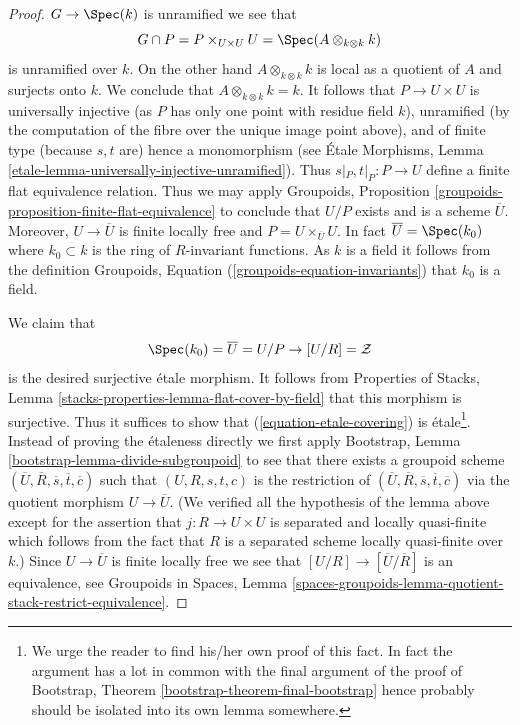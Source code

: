 \begin{proof}
$G \to \Spec(k)$ is unramified we see that
$$
G \cap P = P \times_{U \times U} U = \Spec(A \otimes_{k \otimes k} k)
$$
is unramified over $k$. On the other hand $A \otimes_{k \otimes k} k$
is local as a quotient of $A$ and surjects onto $k$. We conclude that
$A \otimes_{k \otimes k} k = k$. It follows that $P \to U \times U$
is universally injective (as $P$ has only one point with residue field $k$),
unramified (by the computation of the fibre over the unique image point
above), and of finite type (because $s, t$ are) hence a monomorphism (see
\'Etale Morphisms, Lemma
\ref{etale-lemma-universally-injective-unramified}).
Thus $s|_P, t|_P : P \to U$ define a finite flat equivalence
relation. Thus we may apply
Groupoids, Proposition \ref{groupoids-proposition-finite-flat-equivalence}
to conclude that $U/P$ exists and is a scheme $\overline{U}$.
Moreover, $U \to \overline{U}$ is finite locally free and
$P = U \times_{\overline{U}} U$.
In fact $\overline{U} = \Spec(k_0)$ where $k_0 \subset k$ is the
ring of $R$-invariant functions. As $k$ is a field it follows
from the definition
Groupoids, Equation (\ref{groupoids-equation-invariants})
that $k_0$ is a field.

\medskip\noindent
We claim that
\begin{equation}
\label{equation-etale-covering}
\Spec(k_0) = \overline{U} = U/P \to [U/R] = \mathcal{Z}
\end{equation}
is the desired surjective \'etale morphism. It follows from
Properties of Stacks, Lemma \ref{stacks-properties-lemma-flat-cover-by-field}
that this morphism is surjective. Thus it suffices to show that
(\ref{equation-etale-covering}) is \'etale\footnote{We urge the
reader to find his/her own proof of this fact. In fact the argument
has a lot in common with the final argument of the proof of
Bootstrap, Theorem \ref{bootstrap-theorem-final-bootstrap}
hence probably should be isolated into its own lemma somewhere.}.
Instead of proving the \'etaleness
directly we first apply
Bootstrap, Lemma \ref{bootstrap-lemma-divide-subgroupoid}
to see that there exists a groupoid scheme
$(\overline{U}, \overline{R}, \overline{s}, \overline{t}, \overline{c})$
such that $(U, R, s, t, c)$ is the restriction of
$(\overline{U}, \overline{R}, \overline{s}, \overline{t}, \overline{c})$
via the quotient morphism $U \to \overline{U}$.
(We verified all the hypothesis of the lemma above except for the assertion
that $j : R \to U \times U$ is separated and locally quasi-finite
which follows from the fact that $R$ is a separated scheme locally quasi-finite
over $k$.) Since $U \to \overline{U}$ is finite locally free
we see that $[U/R] \to [\overline{U}/\overline{R}]$ is an equivalence, see
Groupoids in Spaces,
Lemma \ref{spaces-groupoids-lemma-quotient-stack-restrict-equivalence}.


\end{proof}
